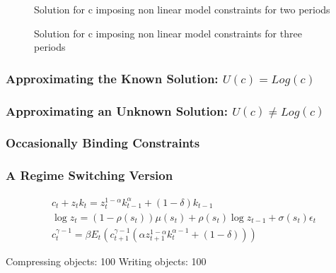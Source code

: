 \documentclass[12pt]{article}
\begin{document}
\begin{figure}
  \centering
 \caption{Solution for c imposing non linear model constraints for two periods}
  \caption{Solution for c imposing non linear model constraints for three periods}
  \label{fig:cfuncsecond}
\end{figure}

\subsubsection{Approximating the Known Solution: $U(c) = Log(c)$ }
\label{sec:recov-known-solut}

\subsubsection{Approximating an Unknown Solution: $U(c) \ne Log(c)$ }
\label{sec:unknown-solut}

\subsubsection{Occasionally Binding Constraints}
\label{sec:obc-solut}


\subsubsection{A Regime Switching Version}
\label{sec:regime-switch-model}



\cite{foerster13}

\begin{gather}
c_t + z_t k_t = z_t^{1-\alpha} k_{t-1}^\alpha + (1-\delta)k_{t-1}\\
 \log z_t = (1-\rho(s_t))\mu(s_t) + \rho(s_t)\log z_{t-1}+ \sigma(s_t) \epsilon_t\\
 c_t^{\gamma-1} = \beta  
 E_t ( c_{t+1}^{\gamma-1} (\alpha z_{t+1}^{1-\alpha} k_t^{\alpha -1} + (1-\delta) ))
\end{gather}

Compressing objects: 100%
Writing objects: 100%
\end{document}
